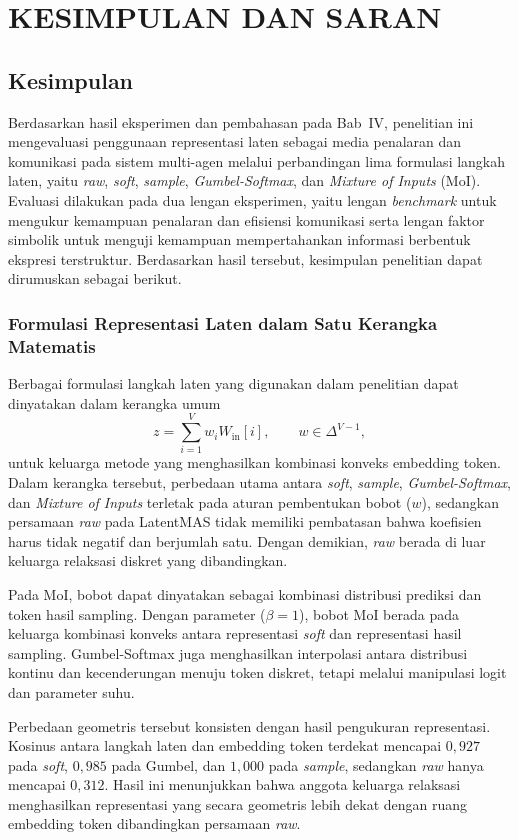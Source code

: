\chapter{KESIMPULAN DAN SARAN}

\section{Kesimpulan}

Berdasarkan hasil eksperimen dan pembahasan pada Bab~IV, penelitian ini
mengevaluasi penggunaan representasi laten sebagai media penalaran dan
komunikasi pada sistem multi-agen melalui perbandingan lima formulasi langkah
laten, yaitu \textit{raw}, \textit{soft}, \textit{sample}, \textit{Gumbel-Softmax},
dan \textit{Mixture of Inputs} (MoI). Evaluasi dilakukan pada dua lengan
eksperimen, yaitu lengan \textit{benchmark} untuk mengukur kemampuan penalaran
dan efisiensi komunikasi serta lengan faktor simbolik untuk menguji kemampuan
mempertahankan informasi berbentuk ekspresi terstruktur. Berdasarkan hasil
tersebut, kesimpulan penelitian dapat dirumuskan sebagai berikut.

\subsection{Formulasi Representasi Laten dalam Satu Kerangka Matematis}

Berbagai formulasi langkah laten yang digunakan dalam penelitian dapat
dinyatakan dalam kerangka umum
\[
z = \sum_{i=1}^{V} w_i W_{\mathrm{in}}[i],
\qquad
w\in\Delta^{V-1},
\]
untuk keluarga metode yang menghasilkan kombinasi konveks embedding token.
Dalam kerangka tersebut, perbedaan utama antara \textit{soft}, \textit{sample},
\textit{Gumbel-Softmax}, dan \textit{Mixture of Inputs} terletak pada aturan
pembentukan bobot ($w$), sedangkan persamaan \textit{raw} pada LatentMAS tidak
memiliki pembatasan bahwa koefisien harus tidak negatif dan berjumlah satu.
Dengan demikian, \textit{raw} berada di luar keluarga relaksasi diskret yang
dibandingkan.

Pada MoI, bobot dapat dinyatakan sebagai kombinasi distribusi prediksi dan
token hasil sampling. Dengan parameter ($\beta=1$), bobot MoI berada pada
keluarga kombinasi konveks antara representasi \textit{soft} dan representasi
hasil sampling. Gumbel-Softmax juga menghasilkan interpolasi antara distribusi
kontinu dan kecenderungan menuju token diskret, tetapi melalui manipulasi
logit dan parameter suhu.

Perbedaan geometris tersebut konsisten dengan hasil pengukuran representasi.
Kosinus antara langkah laten dan embedding token terdekat mencapai $0{,}927$ pada
\textit{soft}, $0{,}985$ pada Gumbel, dan $1{,}000$ pada \textit{sample}, sedangkan
\textit{raw} hanya mencapai $0{,}312$. Hasil ini menunjukkan bahwa anggota keluarga
relaksasi menghasilkan representasi yang secara geometris lebih dekat dengan
ruang embedding token dibandingkan persamaan \textit{raw}.

